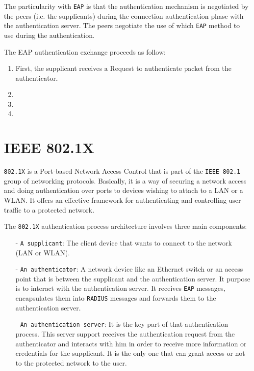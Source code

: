 The particularity with \texttt{EAP} is that the authentication mechanism is negotiated by the peers (i.e. the supplicants) during the connection authentication phase with the authentication server. The peers negotiate the use of which \texttt{EAP} method to use during the authentication. 



The EAP authentication exchange proceeds as follow:



\begin{enumerate}
	\item First, the supplicant receives a Request to authenticate packet from the authenticator.
	\item
	\item
	\item
\end{enumerate}




\section{IEEE 802.1X}
\texttt{802.1X} is a Port-based Network Access Control that is part of the \texttt{IEEE 802.1} group of networking protocols. Basically, it is a way of securing a network access and doing authentication over ports to devices wishing to attach to a LAN or a WLAN. It offers an effective framework for authenticating and controlling user traffic to a protected network.

The \texttt{802.1X} authentication process architecture involves three main components:
\begin{itemize}
	\item[-]\texttt{A supplicant}: The client device that wants to connect to the network (LAN or WLAN).
	\item[-]\texttt{An authenticator}: A network device like an Ethernet switch or an access point that is between the supplicant and the authentication server. It purpose is to interact with the authentication server. It receives \texttt{EAP} messages, encapsulates them into \texttt{RADIUS} messages and forwards them to the authentication server.
	\item[-]\texttt{An authentication server}: It is the key part of that authentication process. This server support receives the authentication request from the authenticator and interacts with him in order to receive more information or credentials for the supplicant. It is the only one that can grant access or not to the protected network to the user.
\end{itemize} 

